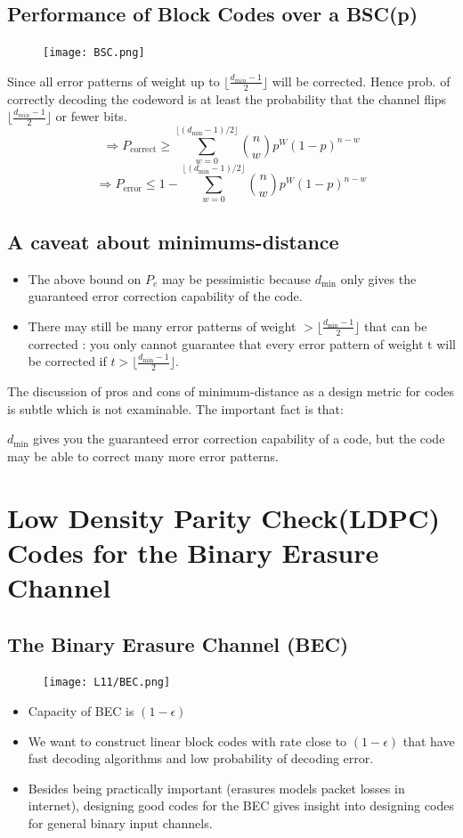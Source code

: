 \documentclass[12pt]{article}
\begin{document}
\subsection{Performance of Block Codes over a BSC(p)}
\begin{figure}[H]
    \centering
    \texttt{[image: BSC.png]}
\end{figure}
Since all error patterns of weight up to $\lfloor\frac{d_{min}-1}{2}\rfloor$ will be corrected. Hence prob. of correctly decoding the codeword is at least the probability that the channel flips $\lfloor\frac{d_{min}-1}{2}\rfloor$ or fewer bits.
\[
\Rightarrow P_{\textrm{correct}}\ge \sum_{w=0}^{\lfloor(d_{\min}-1)/2\rfloor} \binom{n}{w} p^W (1-p)^{n-w}
\]
\[
\Rightarrow P_{\textrm{error}} \le 1 - \sum_{w=0}^{\lfloor(d_{\min}-1)/2\rfloor}\binom{n}{w} p^W (1-p)^{n-w}
\]

\subsection{A caveat about minimums-distance}
\begin{itemize}
    \item The above bound on $P_e$ may be pessimistic because $d_{\min}$ only gives the guaranteed error correction capability of the code.
    \item There may still be many error patterns of weight $> \lfloor\frac{d_{\min}-1}{2}\rfloor$ that can be corrected : you only cannot guarantee that every error pattern of weight t will be corrected if $t>\lfloor\frac{d_{\min}-1}{2}\rfloor$. 
\end{itemize}
The discussion of pros and cons of minimum-distance as a design metric for codes is subtle which is not examinable. The important fact is that:
\begin{center}
    $d_{\min}$ gives you the guaranteed error correction capability of a code, but the code may be able to correct many more error patterns.
\end{center}
\section{Low Density Parity Check(LDPC) Codes for the Binary Erasure Channel}
\subsection{The Binary Erasure Channel (BEC)}
\begin{figure}[H]
    \centering
    \texttt{[image: L11/BEC.png]}
\end{figure}
\begin{itemize}
    \item Capacity of BEC is $(1-\epsilon)$
    \item We want to construct linear block codes with rate close to $(1-\epsilon)$ that have fast decoding algorithms and low probability of decoding error.
    \item Besides being practically important (erasures models packet losses in internet), designing good codes for the BEC gives insight into designing  codes for general binary input channels.
\end{itemize}
\end{document}
